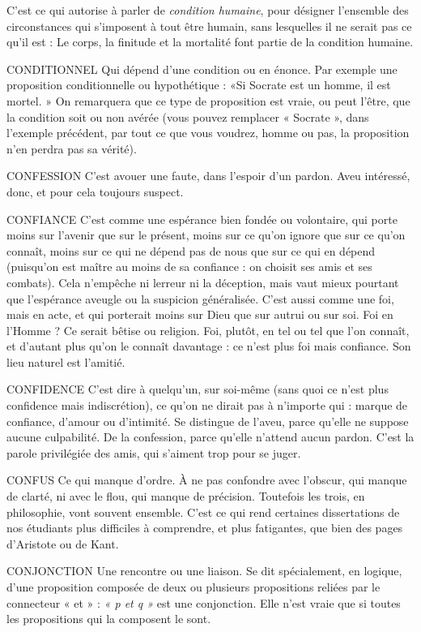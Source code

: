 C’est ce qui autorise à parler de {\it condition humaine}, pour désigner
l’ensemble des circonstances qui s'imposent à tout être humain, sans lesquelles
il ne serait pas ce qu’il est : Le corps, la finitude et la mortalité font partie de la
condition humaine.

CONDITIONNEL Qui dépend d’une condition ou en énonce. Par exemple
une proposition conditionnelle ou hypothétique : «Si
Socrate est un homme, il est mortel. » On remarquera que ce type de proposition
est vraie, ou peut l’être, que la condition soit ou non avérée (vous pouvez
remplacer « Socrate », dans l'exemple précédent, par tout ce que vous voudrez,
homme ou pas, la proposition n’en perdra pas sa vérité).

CONFESSION C’est avouer une faute, dans l'espoir d’un pardon. Aveu
intéressé, donc, et pour cela toujours suspect.

CONFIANCE C’est comme une espérance bien fondée ou volontaire, qui
porte moins sur l’avenir que sur le présent, moins sur ce
qu’on ignore que sur ce qu’on connaît, moins sur ce qui ne dépend pas de nous
que sur ce qui en dépend (puisqu'on est maître au moins de sa confiance : on
choisit ses amis et ses combats). Cela n'empêche ni lerreur ni la déception,
mais vaut mieux pourtant que l’espérance aveugle ou la suspicion généralisée.
C’est aussi comme une foi, mais en acte, et qui porterait moins sur Dieu
que sur autrui ou sur soi. Foi en l'Homme ? Ce serait bêtise ou religion. Foi,
plutôt, en tel ou tel que l’on connaît, et d’autant plus qu’on le connaît
davantage : ce n’est plus foi mais confiance. Son lieu naturel est l'amitié.

CONFIDENCE C'est dire à quelqu'un, sur soi-même (sans quoi ce n’est plus
confidence mais indiscrétion), ce qu’on ne dirait pas à
n'importe qui : marque de confiance, d’amour ou d'intimité. Se distingue de
l’aveu, parce qu’elle ne suppose aucune culpabilité. De la confession, parce
qu’elle n’attend aucun pardon. C’est la parole privilégiée des amis, qui s’aiment
trop pour se juger.

CONFUS Ce qui manque d’ordre. À ne pas confondre avec l’obscur, qui
manque de clarté, ni avec le flou, qui manque de précision. Toutefois
les trois, en philosophie, vont souvent ensemble. C’est ce qui rend certaines
dissertations de nos étudiants plus difficiles à comprendre, et plus fatigantes,
que bien des pages d’Aristote ou de Kant.

CONJONCTION Une rencontre ou une liaison. Se dit spécialement, en
logique, d’une proposition composée de deux ou plusieurs
propositions reliées par le connecteur « et » : {\it « p et q »} est une conjonction.
Elle n’est vraie que si toutes les propositions qui la composent le sont.

